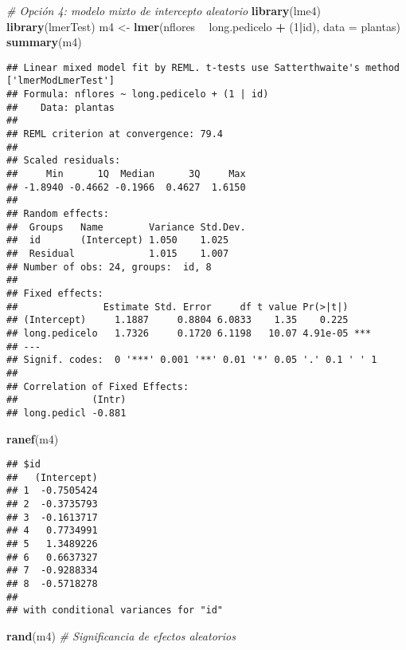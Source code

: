 \documentclass[
]{book}
\newenvironment{Shaded}{\begin{snugshade}}{\end{snugshade}}
\newcommand{\CommentTok}[1]{\textcolor[rgb]{0.56,0.35,0.01}{\textit{#1}}}
\newcommand{\DataTypeTok}[1]{\textcolor[rgb]{0.13,0.29,0.53}{#1}}
\newcommand{\DecValTok}[1]{\textcolor[rgb]{0.00,0.00,0.81}{#1}}
\newcommand{\KeywordTok}[1]{\textcolor[rgb]{0.13,0.29,0.53}{\textbf{#1}}}
\newcommand{\NormalTok}[1]{#1}
\newcommand{\OperatorTok}[1]{\textcolor[rgb]{0.81,0.36,0.00}{\textbf{#1}}}
\newcommand{\StringTok}[1]{\textcolor[rgb]{0.31,0.60,0.02}{#1}}
\begin{document}
\begin{Shaded}
\begin{Highlighting}[]
\CommentTok{# Opción 4: modelo mixto de intercepto aleatorio}
\KeywordTok{library}\NormalTok{(lme4)}
\KeywordTok{library}\NormalTok{(lmerTest)}
\NormalTok{m4 <-}\StringTok{ }\KeywordTok{lmer}\NormalTok{(nflores }\OperatorTok{~}\StringTok{ }\NormalTok{long.pedicelo }\OperatorTok{+}\StringTok{ }\NormalTok{(}\DecValTok{1}\OperatorTok{|}\NormalTok{id), }\DataTypeTok{data =}\NormalTok{ plantas)}
\KeywordTok{summary}\NormalTok{(m4)}
\end{Highlighting}
\end{Shaded}

\begin{verbatim}
## Linear mixed model fit by REML. t-tests use Satterthwaite's method ['lmerModLmerTest']
## Formula: nflores ~ long.pedicelo + (1 | id)
##    Data: plantas
## 
## REML criterion at convergence: 79.4
## 
## Scaled residuals: 
##     Min      1Q  Median      3Q     Max 
## -1.8940 -0.4662 -0.1966  0.4627  1.6150 
## 
## Random effects:
##  Groups   Name        Variance Std.Dev.
##  id       (Intercept) 1.050    1.025   
##  Residual             1.015    1.007   
## Number of obs: 24, groups:  id, 8
## 
## Fixed effects:
##               Estimate Std. Error     df t value Pr(>|t|)    
## (Intercept)     1.1887     0.8804 6.0833    1.35    0.225    
## long.pedicelo   1.7326     0.1720 6.1198   10.07 4.91e-05 ***
## ---
## Signif. codes:  0 '***' 0.001 '**' 0.01 '*' 0.05 '.' 0.1 ' ' 1
## 
## Correlation of Fixed Effects:
##             (Intr)
## long.pedicl -0.881
\end{verbatim}

\begin{Shaded}
\begin{Highlighting}[]
\KeywordTok{ranef}\NormalTok{(m4) }
\end{Highlighting}
\end{Shaded}

\begin{verbatim}
## $id
##   (Intercept)
## 1  -0.7505424
## 2  -0.3735793
## 3  -0.1613717
## 4   0.7734991
## 5   1.3489226
## 6   0.6637327
## 7  -0.9288334
## 8  -0.5718278
## 
## with conditional variances for "id"
\end{verbatim}

\begin{Shaded}
\begin{Highlighting}[]
\KeywordTok{rand}\NormalTok{(m4) }\CommentTok{# Significancia de efectos aleatorios}
\end{Highlighting}
\end{Shaded}
\end{document}
